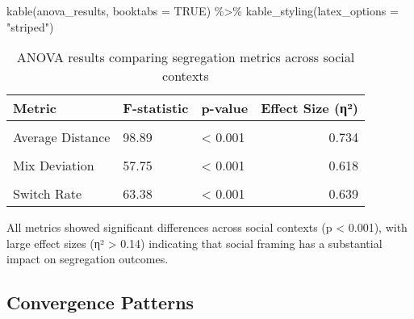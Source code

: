 \documentclass[
  11pt,
]{article}
\newenvironment{Shaded}{\begin{snugshade}}{\end{snugshade}}
\newcommand{\AttributeTok}[1]{\textcolor[rgb]{0.40,0.45,0.13}{#1}}
\newcommand{\ConstantTok}[1]{\textcolor[rgb]{0.56,0.35,0.01}{#1}}
\newcommand{\FunctionTok}[1]{\textcolor[rgb]{0.28,0.35,0.67}{#1}}
\newcommand{\NormalTok}[1]{\textcolor[rgb]{0.00,0.23,0.31}{#1}}
\newcommand{\SpecialCharTok}[1]{\textcolor[rgb]{0.37,0.37,0.37}{#1}}
\newcommand{\StringTok}[1]{\textcolor[rgb]{0.13,0.47,0.30}{#1}}
\begin{document}
\begin{Shaded}
\begin{Highlighting}[]
\FunctionTok{kable}\NormalTok{(anova\_results, }\AttributeTok{booktabs =} \ConstantTok{TRUE}\NormalTok{) }\SpecialCharTok{\%\textgreater{}\%}
  \FunctionTok{kable\_styling}\NormalTok{(}\AttributeTok{latex\_options =} \StringTok{"striped"}\NormalTok{)}
\end{Highlighting}
\end{Shaded}

\begin{longtable}[t]{lllr}
\caption{ANOVA results comparing segregation metrics across social contexts}\tabularnewline

\toprule
Metric & F-statistic & p-value & Effect Size (η²)\\
\midrule
\cellcolor{gray!10}{Number of Clusters} & \cellcolor{gray!10}{32.65} & \cellcolor{gray!10}{< 0.001} & \cellcolor{gray!10}{0.477}\\
Average Distance & 98.89 & < 0.001 & 0.734\\
\cellcolor{gray!10}{Ghetto Formation Rate} & \cellcolor{gray!10}{73.26} & \cellcolor{gray!10}{< 0.001} & \cellcolor{gray!10}{0.672}\\
Mix Deviation & 57.75 & < 0.001 & 0.618\\
\cellcolor{gray!10}{Segregation Share} & \cellcolor{gray!10}{64.33} & \cellcolor{gray!10}{< 0.001} & \cellcolor{gray!10}{0.643}\\
\addlinespace
Switch Rate & 63.38 & < 0.001 & 0.639\\
\bottomrule
\end{longtable}

All metrics showed significant differences across social contexts (p
\textless{} 0.001), with large effect sizes (η² \textgreater{} 0.14)
indicating that social framing has a substantial impact on segregation
outcomes.

\subsection{Convergence Patterns}\label{convergence-patterns}
\end{document}
